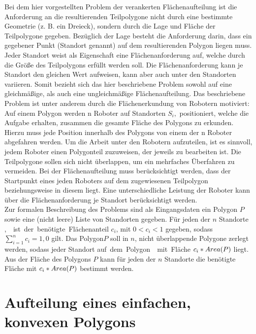 \documentclass[ngerman]{seminarbeitrag}
\begin{document}
Bei dem hier vorgestellten Problem der verankerten Flächenaufteilung ist die Anforderung an die resultierenden Teilpolygone nicht durch eine bestimmte Geometrie
(z. B. ein Dreieck), sondern durch die Lage und Fläche der Teilpolygone gegeben. Bezüglich der Lage besteht die Anforderung darin, dass ein gegebener Punkt (Standort genannt) auf
dem resultierenden Polygon liegen muss. Jeder Standort weist als Eigenschaft eine Flächenanforderung auf, welche durch die Größe des Teilpolygons erfüllt werden soll. Die
Flächenanforderung kann je Standort den gleichen Wert aufweisen, kann aber auch unter den Standorten variieren. Somit bezieht sich das hier beschriebene Problem sowohl auf eine
gleichmäßige, als auch eine ungleichmäßige Flächenaufteilung. Das beschriebene Problem ist unter anderem durch die Flächenerkundung von Robotern motiviert: \\

Auf einem Polygon werden n Roboter auf Standorten $S_{i},$ \iton positioniert, welche die Aufgabe erhalten, zusammen die gesamte Fläche des Polygons zu
erkunden. Hierzu muss jede Position innerhalb des Polygons von einem der n Roboter abgefahren werden. Um die Arbeit unter den Robotern aufzuteilen, ist es sinnvoll, jedem Roboter einen
Polygonteil zuzuweisen, der jeweils zu bearbeiten ist. Die Teilpolygone sollen sich nicht überlappen, um ein mehrfaches Überfahren zu vermeiden. Bei der Flächenaufteilung muss
berücksichtigt werden, dass der Startpunkt eines jeden Roboters auf dem zugewiesenen Teilpolygon beziehungsweise in diesem liegt. Eine unterschiedliche Leistung der Roboter kann über die
Flächenanforderung je Standort berücksichtigt werden. \\

Zur formalen Beschreibung des Problems sind als Eingangsdaten ein Polygon $P$ sowie eine (nicht leere) Liste von Standorten  gegeben. Für jeden der $n$
Standorte \si, \iton ist der benötigte Flächenanteil $c_{i}$, \iton mit $0 < c_{i} < 1$ gegeben, sodass $\sum_{i=1}^{n}c_{i}=1,0$ gilt. Das Polygon$P$ soll in $n$, nicht
überlappende Polygone zerlegt werden, sodass jeder Standort \si auf dem Polygon \pi mit Fläche $c_{i}* Area(P)$ liegt. Aus der Fläche des Polygons $P$ kann für jeden der $n$ Standorte die
benötigte Fläche mit $c_{i}* Area(P)$ bestimmt werden.


\section{Aufteilung eines einfachen, konvexen Polygons}\label{konvex}
\end{document}
